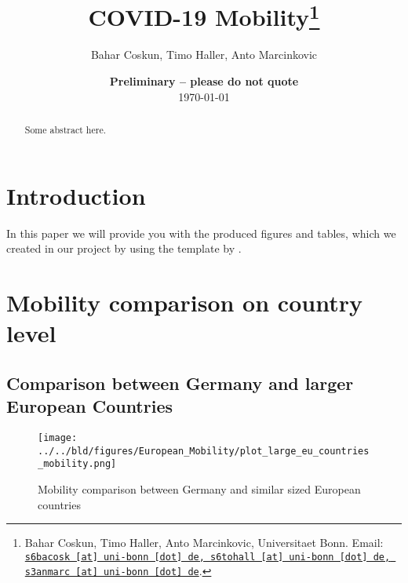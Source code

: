 \documentclass[11pt, a4paper, leqno]{article}
\begin{document}
\title{COVID-19 Mobility\thanks{Bahar Coskun, Timo Haller, Anto Marcinkovic, Universitaet Bonn. Email: \href{mailto:s6bacosk@uni-bonn.de, s6tohall@uni-bonn.de, s3anmarc@uni-bonn.de}{\nolinkurl{s6bacosk [at] uni-bonn [dot] de, s6tohall [at] uni-bonn [dot] de, s3anmarc [at] uni-bonn [dot] de}}.}}

\author{Bahar Coskun, Timo Haller, Anto Marcinkovic}

\date{
    {\bf Preliminary -- please do not quote}
    \\[1ex]
    \today
}

\maketitle


\begin{abstract}
    Some abstract here.
\end{abstract}
\clearpage

\tableofcontents
\clearpage

\section{Introduction} %
\label{sec:introduction}

In this paper we will provide you with the produced figures and tables, which we created in our project by using the template by \citet{GaudeckerEconProjectTemplates}.




\newpage
\section{Mobility comparison on country level}
\subsection{Comparison between Germany and larger European Countries}
\begin{figure}
	\centering
	\caption{Mobility comparison between Germany and similar sized European countries}
	\texttt{[image: ../../bld/figures/European\_Mobility/plot\_large\_eu\_countries\_mobility.png]}
\end{figure}
\end{document}
